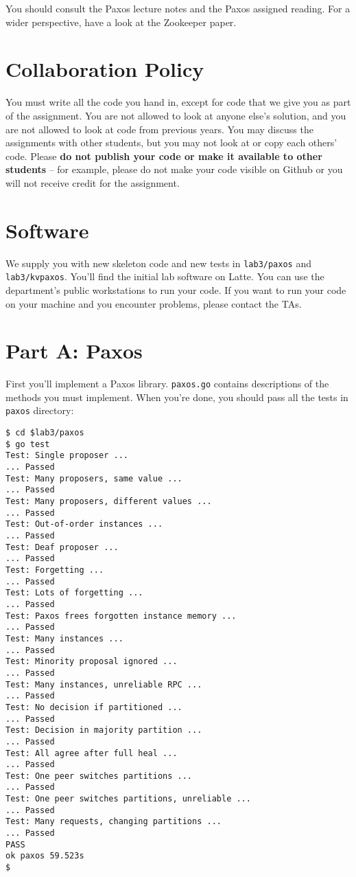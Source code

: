 \documentclass{article}
\newcommand{\code}{\texttt}
\begin{document}
You should consult the Paxos lecture notes and the Paxos assigned
reading. For a wider perspective, have a look at the Zookeeper paper.

\section{Collaboration Policy}
You must write all the code you hand in, except for code that we give you as part of the assignment. You are not allowed to look at anyone else's solution, and you are not allowed to look at code from previous years. You may discuss the assignments with other students, but you may not look at or copy each others' code. Please \textbf{do not publish your code or make it available to other students} -- for example, please do not make your code visible on Github or you will not receive credit for the assignment.

\section{Software}
We supply you with new skeleton code and new tests in \code{lab3/paxos} and
\code{lab3/kvpaxos}. You'll find the initial lab software on Latte. You can use the
department's public workstations to run your code. If you want to run
your code on your machine and you encounter problems, please
contact the TAs.

\section{Part A: Paxos}
First you'll implement a Paxos library. \code{paxos.go} contains descriptions of
the methods you must implement. When you're done, you should pass
all the tests in \code{paxos} directory:

\begin{lstlisting}
$ cd $lab3/paxos
$ go test
Test: Single proposer ...
... Passed
Test: Many proposers, same value ...
... Passed
Test: Many proposers, different values ...
... Passed
Test: Out-of-order instances ...
... Passed
Test: Deaf proposer ...
... Passed
Test: Forgetting ...
... Passed
Test: Lots of forgetting ...
... Passed
Test: Paxos frees forgotten instance memory ...
... Passed
Test: Many instances ...
... Passed
Test: Minority proposal ignored ...
... Passed
Test: Many instances, unreliable RPC ...
... Passed
Test: No decision if partitioned ...
... Passed
Test: Decision in majority partition ...
... Passed
Test: All agree after full heal ...
... Passed
Test: One peer switches partitions ...
... Passed
Test: One peer switches partitions, unreliable ...
... Passed
Test: Many requests, changing partitions ...
... Passed
PASS
ok paxos 59.523s
$
\end{lstlisting}
\end{document}

